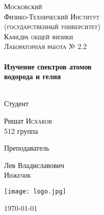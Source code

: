 \begin{titlepage}
\center %
 

\textsc{\LARGE Московский\\[-0.2cm]Физико-Технический Институт\\[0.1cm]\large (государственный университет)}\\[1.5cm] %
\textsc{\Large Кафедра общей физики}\\[0.1cm] %
\textsc{\large Лабораторная работа № 2.2}\\[0.5cm] %


\HRule
\\
{\huge \bfseries Изучение спектров атомов \\[2mm]
водорода и гелия}
\\[0.3cm] %
\HRule
\\[1.5cm]


 

\begin{minipage}[t]{0.48\textwidth}
	\begin{flushleft} \large
		\textsf{Студент}
		
		Ришат \textsc{Исхаков} \\[-0.15cm]
		512 группа

	\end{flushleft}
\end{minipage}
\hfill
\begin{minipage}[t]{0.48\textwidth}
	\begin{flushright} \large
		\textsf{Преподаватель}		
		
		Лев Владиславович \\[-0.15cm]
		\textsc{Инжечик} 

	\end{flushright}
\end{minipage}

\begin{bottompar}
	\begin{center}
		\texttt{[image: logo.jpg]}
	\end{center}
	\today

\end{bottompar}
\vfill %

\end{titlepage}